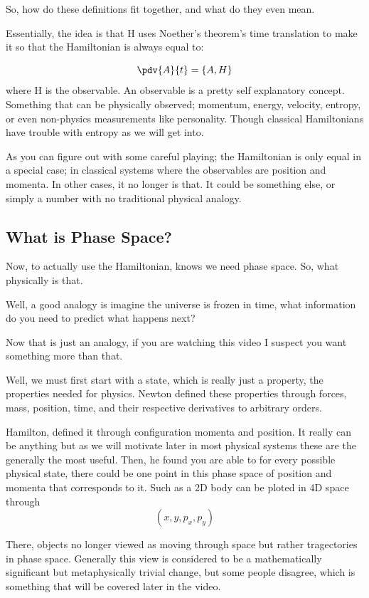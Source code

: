 So, how do these definitions fit together, and what do they even mean.

Essentially, the idea is that H uses Noether's theorem's time translation to make it so that the Hamiltonian is always equal to:

\[
\pdv{A}{t} = \left\{A,H  \right\}
  \]
  where H is the observable. An observable is a pretty self explanatory concept. Something that can be physically observed; momentum, energy, velocity, entropy, or even non-physics measurements like personality. Though classical Hamiltonians have trouble with entropy as we will get into.

  As you can figure out with some careful playing; the Hamiltonian is only equal in a special case; in classical systems where the observables are position and momenta. In other cases, it no longer is that. It could be something else, or simply a number with no traditional physical analogy.



\subsection{What is Phase Space?}
Now, to actually use the Hamiltonian, knows we need phase space. So, what physically is that.

Well, a good analogy is imagine the universe is frozen in time, what information do you need to predict what happens next?


Now that is just an analogy, if you are watching this video I suspect you want something more than that.

Well, we must first start with a state, which is really just a property, the properties needed for physics. Newton defined these properties through forces, mass, position, time, and their respective derivatives to arbitrary orders.

Hamilton, defined it through configuration momenta and position. It really can be anything but as we will motivate later in most physical systems these are the generally the most useful. Then, he found you are able to for every possible physical state, there could be one point in this phase space of position and momenta that corresponds to it. Such as a 2D body can be ploted in 4D space through
\[
(x,y,p_x,p_y)
\]

There, objects no longer viewed as moving through space but rather tragectories in phase space. Generally this view is considered to be a mathematically significant but metaphysically trivial change, but some people disagree, which is something that will be covered later in the video.

